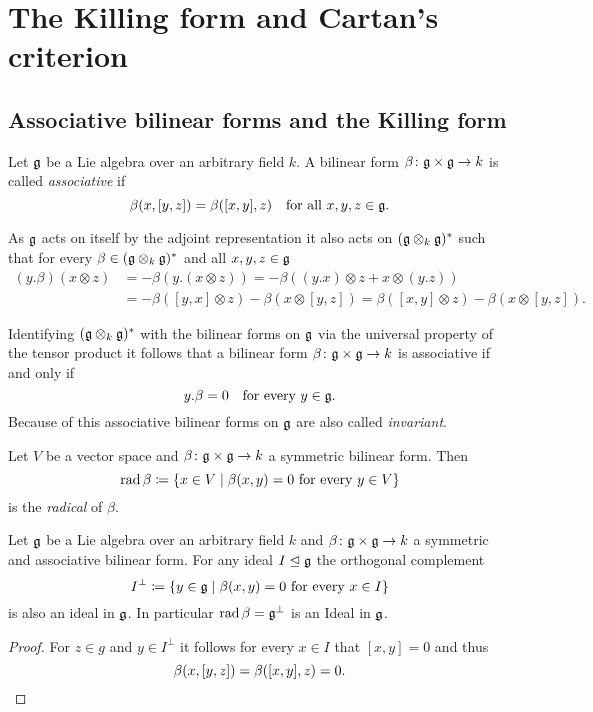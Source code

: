 \section{The Killing form and Cartan’s criterion}





\subsection{Associative bilinear forms and the Killing form}


\begin{defi}
 Let $\mathfrak{g}$ be a Lie algebra over an arbitrary field $k$. A bilinear form $\beta \colon \mathfrak{g} \times \mathfrak{g} \to k$ is called \emph{associative} if
 \[
  \beta(x,[y,z]) = \beta([x,y],z) \quad \text{for all $x,y,z \in \mathfrak{g}$}.
 \]
\end{defi}


\begin{rem}
 As $\mathfrak{g}$ acts on itself by the adjoint representation it also acts on $(\mathfrak{g} \otimes_k \mathfrak{g})^*$ such that for every $\beta \in (\mathfrak{g} \otimes_k \mathfrak{g})^*$ and all $x,y,z \in \mathfrak{g}$
 \begin{align*}
  (y.\beta)(x \otimes z)
  &= -\beta(y.(x \otimes z))
  = -\beta((y.x) \otimes z + x \otimes (y.z)) \\
  &= -\beta([y,x] \otimes z) -\beta(x \otimes [y,z])
  = \beta([x,y] \otimes z) - \beta(x \otimes [y,z]).
 \end{align*}
 
 \begin{samepage} Identifying $(\mathfrak{g} \otimes_k \mathfrak{g})^*$ with the bilinear forms on $\mathfrak{g}$ via the universal property of the tensor product it follows that a bilinear form $\beta \colon \mathfrak{g} \times \mathfrak{g} \to k$ is associative if and only if
 \[
  y.\beta = 0 \quad \text{for every $y \in \mathfrak{g}$}.
 \]
 Because of this associative bilinear forms on $\mathfrak{g}$ are also called \emph{invariant}. \end{samepage}
\end{rem}



\begin{defi}
 Let $V$ be a vector space and $\beta \colon \mathfrak{g} \times \mathfrak{g} \to k$ a symmetric bilinear form. Then
 \[
  \operatorname{rad} \beta \coloneqq \{x \in V \mid \text{$\beta(x,y) = 0$ for every $y \in V$}\}
 \]
 is the \emph{radical} of $\beta$.
\end{defi}


\begin{lem}\label{lem: orthogonal complement of an ideal is again an ideal}
 Let $\mathfrak{g}$ be a Lie algebra over an arbitrary field $k$ and \mbox{$\beta \colon \mathfrak{g} \times \mathfrak{g} \to k$} a symmetric and associative bilinear form. For any ideal $I \trianglelefteq \mathfrak{g}$ the orthogonal complement
 \[
  I^\perp \coloneqq \{y \in \mathfrak{g} \mid \text{$\beta(x,y) = 0$ for every $x \in I$}\}
 \]
 is also an ideal in $\mathfrak{g}$. In particular $\operatorname{rad} \beta = \mathfrak{g}^\perp$ is an Ideal in $\mathfrak{g}$.
\end{lem}
\begin{proof}
 For $z \in g$ and $y \in I^\perp$ it follows for every $x \in I$ that $[x,y] = 0$ and thus
 \[
  \beta(x,[y,z]) = \beta([x,y],z) = 0.
  \qedhere
 \]
\end{proof}


